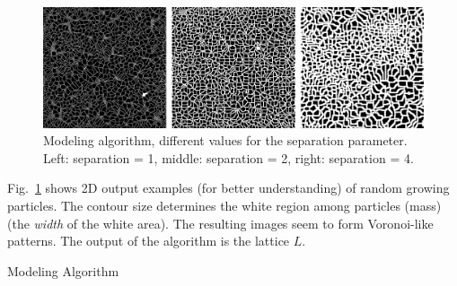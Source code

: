 \begin{figure}
 \centerline{\includegraphics[width=13cm]{sistdin1}}
  \caption{Modeling algorithm, different values for the separation parameter. Left: separation = 1, middle: separation = 2, right: separation = 4.}
  \label{fg:fig1}
\end{figure}

Fig.~\ref{fg:fig1} shows 2D output examples (for better understanding) of random growing particles.
The contour size determines the white region among particles (mass) (the {\em width} of the white area). 
The resulting images seem to form Voronoi-like patterns.
The output of the algorithm is the lattice $L$.

\begin{algorithm}[ht!]
\caption{Modeling Algorithm}
\begin{algorithmic}


    \EndFor
\EndFor

        \EndIf
                        
            \EndIf
        \EndFor
    \EndFor
\EndFor
\end{algorithmic}
\end{algorithm}


